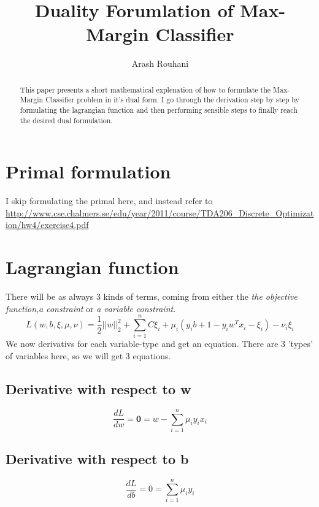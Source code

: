 \documentclass[a4paper,11pt]{article}
\title{Duality Forumlation of Max-Margin Classifier}
\author{Arash Rouhani}
\begin{document}
\maketitle

\begin{abstract}
This paper presents a short mathematical explenation of how to formulate
the Max-Margin Classifier problem in it's dual form.
I go through the derivation step by step by formulating the lagrangian
function and then performing sensible steps to finally reach the desired dual formulation. 

\end{abstract}

\section{Primal formulation}
I skip formulating the primal here, and instead refer to \url{http://www.cse.chalmers.se/edu/year/2011/course/TDA206_Discrete_Optimization/hw4/exercise4.pdf}
\section{Lagrangian function}
There will be as always 3 kinds of terms, coming from either the \textit{the objective function},\textit{a constraint} or \textit{a variable constraint}.
\begin{equation}
L(w, b, \xi, \mu, \nu) = \frac{1}{2} ||w||^2_2 + \sum\limits_{i=1}^n {C\xi_i + \mu_i(y_ib + 1 - y_iw^Tx_i - \xi_i) - \nu_i\xi_i}
\end{equation}
We now derivativs for each variable-type and get an equation. There are 3 'types' of variables here, so we will get 3 equations.

\subsection{Derivative with respect to w}
  \begin{equation}
    \frac{dL}{dw} = \textbf{0} = w - \sum\limits_{i=1}^n {\mu_i y_i x_i}
  \end{equation}
\subsection{Derivative with respect to b}
  \begin{equation}
    \frac{dL}{db} = 0 = \sum\limits_{i=1}^n {\mu_i y_i}
  \end{equation}
\end{document}
